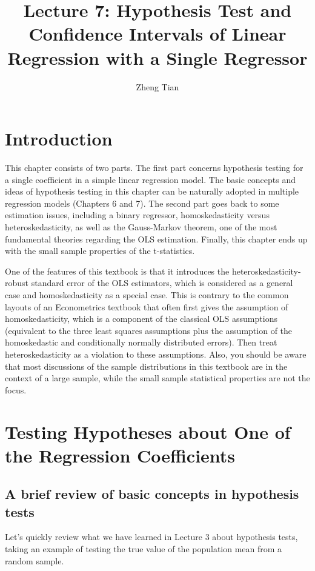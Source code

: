 \documentclass[a4paper,11pt]{article}
\author{Zheng Tian}
\date{}
\title{Lecture 7: Hypothesis Test and Confidence Intervals of Linear Regression with a Single Regressor}
\begin{document}
\maketitle
\setcounter{tocdepth}{1}
\tableofcontents



\section{Introduction}
\label{sec:orgca67df3}

This chapter consists of two parts. The first part concerns hypothesis
testing for a single coefficient in a simple linear regression
model. The basic concepts and ideas of hypothesis testing in this
chapter can be naturally adopted in multiple regression models
(Chapters 6 and 7). The second part goes back to some estimation
issues, including a binary regressor, homoskedasticity versus
heteroskedasticity, as well as the Gauss-Markov theorem, one of the
most fundamental theories regarding the OLS estimation. Finally,
this chapter ends up with the small sample properties of the
t-statistics.

One of the features of this textbook is that it introduces the
heteroskedasticity-robust standard error of the OLS estimators, which
is considered as a general case and homoskedasticity as a special
case. This is contrary to the common layouts of an Econometrics
textbook that often first gives the assumption of homoskedasticity,
which is a component of the classical OLS assumptions (equivalent to
the three least squares assumptions plus the assumption of the
homoskedastic and conditionally normally distributed errors). Then
treat heteroskedasticity as a violation to these assumptions. Also,
you should be aware that most discussions of the sample distributions
in this textbook are in the context of a large sample, while the small
sample statistical properties are not the focus.


\section{Testing Hypotheses about One of the Regression Coefficients}
\label{sec:orgb06cc80}

\subsection{A brief review of basic concepts in hypothesis tests}
\label{sec:org81c1e0c}

Let's quickly review what we have learned in Lecture 3 about
hypothesis tests, taking an example of testing the true value of the
population mean from a random sample.
\end{document}
